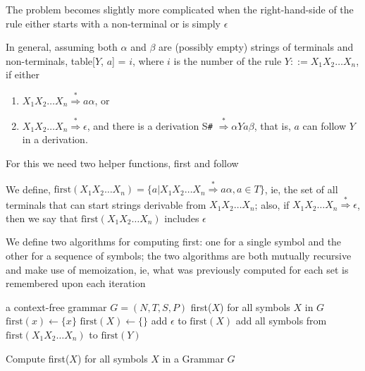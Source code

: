 \documentclass[8pt,a4paper,compress]{beamer}
\newcommand{\derives}{\stackrel{*}{\Rightarrow}}
\begin{document}
\begin{frame}[fragile]
\pause

The problem becomes slightly more complicated when the right-hand-side of the rule either starts with a non-terminal or is simply $\epsilon$

\pause
\bigskip

In general, assuming both $\alpha$ and $\beta$ are (possibly empty) strings of terminals and non-terminals, table[$Y$, $a$] = $i$, where $i$ is the number of the rule $Y ::= X_1X_2 \dots X_n$, if either

\begin{enumerate}
\item $X_1X_2\dots X_n \derives a\alpha$, or
\item $X_1X_2\dots X_n \derives \epsilon$, and there is a derivation S\lstinline{#} $\derives \alpha Y a\beta$, that is, $a$ can follow $Y$ in a derivation.
\end{enumerate}

\pause
\bigskip

For this we need two helper functions, first and follow

\pause
\bigskip

We define, $\text{first}(X_1X_2 \dots X_n) = \{a | X_1X_2 \dots X_n \derives a\alpha, a \in T\}$, ie, the set of all terminals that can start strings derivable from $X_1X_2 \dots X_n$; also, if $X_1X_2 \dots X_n \derives \epsilon$, then we say that $\text{first}(X_1X_2 \dots X_n)$ includes $\epsilon$

\pause
\bigskip

We define two algorithms for computing first: one for a single symbol and the other for a sequence of symbols; the two algorithms are both mutually recursive and make use of memoization, ie, what was previously computed for each set is remembered upon each iteration
\end{frame}

\begin{frame}[fragile]
\pause


\begin{algorithm}[H]
\begin{algorithmic}
\REQUIRE a context-free grammar $G = (N,T,S,P)$
\ENSURE first($X$) for all symbols $X$ in $G$
\STATE $\text{first}(x) \gets \{x\}$
\ENDFOR
{}
\STATE $\text{first}(X) \gets \{\}$
\ENDFOR
{}
\STATE add $\epsilon$ to $\text{first}(X)$
\ENDIF
\REPEAT
{}
\STATE add all symbols from $\text{first}(X_1X_2 \dots X_n)$ to $\text{first}(Y)$
\ENDFOR
{}
\end{algorithmic}
\caption{Compute first($X$) for all symbols $X$ in a Grammar $G$}
\end{algorithm}
\end{frame}
\end{document}
